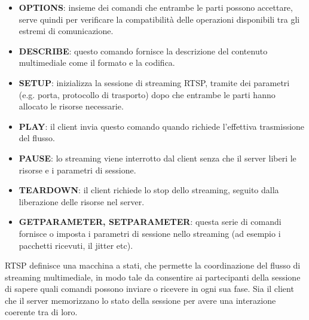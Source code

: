 \begin{itemize}
	\item \textbf{OPTIONS}: insieme dei comandi che entrambe le parti possono accettare, serve quindi per verificare la compatibilità delle operazioni disponibili tra gli estremi di comunicazione.
	\item \textbf{DESCRIBE}: questo comando fornisce la descrizione del contenuto multimediale come il formato e la codifica. 
	\item \textbf{SETUP}: inizializza la sessione di streaming RTSP, tramite dei parametri (e.g. porta, protocollo di trasporto) dopo che entrambe le parti hanno allocato le risorse necessarie.
	\item \textbf{PLAY}: il client invia questo comando quando richiede l'effettiva trasmissione del flusso.
	\item \textbf{PAUSE}: lo streaming viene interrotto dal client senza che il server liberi le risorse e i parametri di sessione.
	\item \textbf{TEARDOWN}: il client richiede lo stop dello streaming, seguito dalla liberazione delle risorse nel server.
	\item \textbf{GET\textunderscore PARAMETER, SET\textunderscore PARAMETER}: questa serie di comandi fornisce o imposta i parametri di sessione nello streaming (ad esempio i pacchetti ricevuti, il jitter etc). 
\end{itemize}

RTSP definisce una macchina a stati, che permette la coordinazione del flusso di streaming multimediale, in modo tale da consentire ai partecipanti della sessione di sapere quali comandi possono inviare o ricevere in ogni sua fase. Sia il client che il server memorizzano lo stato della sessione per avere una interazione coerente tra di loro. 


